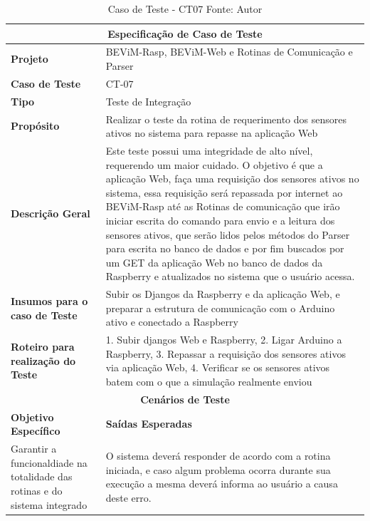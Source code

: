 \begin{table}[H]
    \begin{center}
        \begin{tabular}{|p{5cm}|p{12cm}|}
            \hline
            \multicolumn{2}{|c|}{\textbf{Especificação de Caso de Teste}} \\ \hline
                \textbf{Projeto}                                        & BEViM-Rasp, BEViM-Web e Rotinas de Comunicação e Parser\\ \hline
                \textbf{Caso de Teste}                             & CT-07 \\ \hline
                \textbf{Tipo}                                             & Teste de Integração \\ \hline
                \textbf{Propósito}                                     & Realizar o teste da rotina de requerimento dos sensores ativos no sistema para repasse na aplicação Web \\ \hline
                \textbf{Descrição Geral}                           & Este teste possui uma integridade de alto nível, requerendo um maior cuidado. O objetivo é que a aplicação Web, faça uma requisição dos sensores ativos no sistema, essa requisição será repassada por internet ao BEViM-Rasp até as Rotinas de comunicação que irão iniciar escrita do comando para envio e a leitura dos sensores ativos, que serão lidos pelos métodos do Parser para escrita no banco de dados e por fim buscados por um GET da aplicação Web no banco de dados da Raspberry e atualizados no sistema que o usuário acessa. \\ \hline
                \textbf{Insumos para o caso de Teste}    & Subir os Djangos da Raspberry e da aplicação Web, e preparar a estrutura de comunicação com o Arduino ativo e conectado a Raspberry \\ \hline
                \textbf{Roteiro para realização do Teste}&  1. Subir djangos Web e Raspberry, 2. Ligar Arduino a Raspberry, 3. Repassar a requisição dos sensores ativos via aplicação Web, 4. Verificar se os sensores ativos batem com o que a simulação realmente enviou \\ \hline
            \multicolumn{2}{|c|}{\textbf{Cenários de Teste}} \\ \hline
                \textbf{Objetivo Específico}                      & \textbf{Saídas Esperadas} \\ \hline
                Garantir a funcionaldiade na totalidade das rotinas e do sistema integrado & O sistema deverá responder de acordo com a rotina iniciada, e caso algum problema ocorra durante sua execução a mesma deverá informa ao usuário a causa deste erro. \\ \hline
        \end{tabular}
    \end{center}
    \caption[Caso de Teste - CT07]{Caso de Teste - CT07
    \protect Fonte: Autor}
    \label{CT-07}
\end{table}

